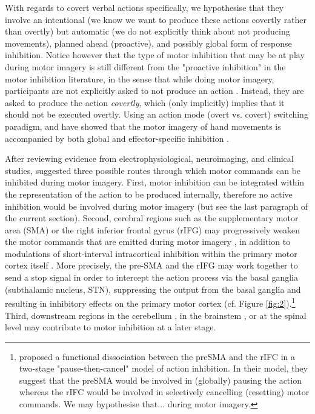 \documentclass[utf8]{template/frontiersSCNS} %
\begin{document}
With regards to covert verbal actions specifically, we hypothesise that they involve an intentional (we know we want to produce these actions covertly rather than overtly) but automatic (we do not explicitly think about not producing movements), planned ahead (proactive), and possibly global form of response inhibition. Notice however that the type of motor inhibition that may be at play during motor imagery is still different from the "proactive inhibition" in the motor inhibition literature, in the sense that while doing motor imagery, participants are not explicitly asked to not produce an action \citep{guillot_imagining_2012}. Instead, they are asked to produce the action \textit{covertly}, which (only implicitly) implies that it should not be executed overtly. Using an action mode (overt vs. covert) switching paradigm, \cite{rieger_inhibition_2017} and \cite{bart_inhibitory_2021} have showed that the motor imagery of hand movements is accompanied by both global and effector-specific inhibition \citep[these results were also replicated in][]{scheil_motor_2018}.


After reviewing evidence from electrophysiological, neuroimaging, and clinical studies, \cite{guillot_imagining_2012} suggested three possible routes through which motor commands can be inhibited during motor imagery. First, motor inhibition can be integrated within the representation of the action to be produced internally, therefore no active inhibition would be involved during motor imagery (but see the last paragraph of the current section). Second, cerebral regions such as the supplementary motor area (SMA) \citep{kasess_suppressive_2008} or the right inferior frontal gyrus (rIFG) may progressively weaken the motor commands that are emitted during motor imagery \citep[e.g.,][]{angelini_motor_2015, angelini_proactive_2016}, in addition to modulations of short-interval intracortical inhibition within the primary motor cortex itself \citep{neige_unravelling_2020}. More precisely, the pre-SMA and the rIFG may work together to send a stop signal in order to intercept the action process via the basal ganglia (subthalamic nucleus, STN), suppressing the output from the basal ganglia and resulting in inhibitory effects on the primary motor cortex \cite{aron_reactive_2011} (cf. Figure \ref{fig:2}).\footnote{\cite{diesburg_pause-then-cancel_2021} proposed a functional dissociation between the preSMA and the rIFC in a two-stage "pause-then-cancel" model of action inhibition. In their model, they suggest that the preSMA would be involved in (globally) pausing the action whereas the rIFC would be involved in selectively cancelling (resetting) motor commands. We may hypothesise that... during motor imagery.} Third, downstream regions in the cerebellum \citep[e.g.,][]{lotze_activation_1999}, in the brainstem \citep[e.g.,][]{jeannerod_neural_2001, jeannerod_motor_2006}, or at the spinal level may contribute to motor inhibition at a later stage.
\end{document}
